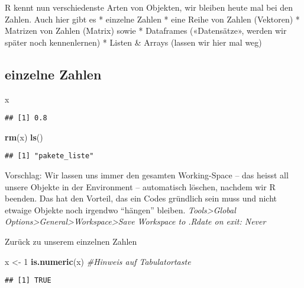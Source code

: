 \documentclass[
]{book}
\newenvironment{Shaded}{\begin{snugshade}}{\end{snugshade}}
\newcommand{\CommentTok}[1]{\textcolor[rgb]{0.56,0.35,0.01}{\textit{#1}}}
\newcommand{\DecValTok}[1]{\textcolor[rgb]{0.00,0.00,0.81}{#1}}
\newcommand{\KeywordTok}[1]{\textcolor[rgb]{0.13,0.29,0.53}{\textbf{#1}}}
\newcommand{\NormalTok}[1]{#1}
\newcommand{\StringTok}[1]{\textcolor[rgb]{0.31,0.60,0.02}{#1}}
\begin{document}
R kennt nun verschiedenste Arten von Objekten, wir bleiben heute mal bei den Zahlen.
Auch hier gibt es
* einzelne Zahlen
* eine Reihe von Zahlen (Vektoren)
* Matrizen von Zahlen (Matrix)
sowie
* Dataframes («Datensätze», werden wir später noch kennenlernen)
* Listen \& Arrays (lassen wir hier mal weg)

\hypertarget{einzelne-zahlen}{%
\subsection{einzelne Zahlen}\label{einzelne-zahlen}}

\begin{Shaded}
\begin{Highlighting}[]
\NormalTok{x}
\end{Highlighting}
\end{Shaded}

\begin{verbatim}
## [1] 0.8
\end{verbatim}

\begin{Shaded}
\begin{Highlighting}[]
\KeywordTok{rm}\NormalTok{(x)}
\KeywordTok{ls}\NormalTok{()}
\end{Highlighting}
\end{Shaded}

\begin{verbatim}
## [1] "pakete_liste"
\end{verbatim}

Vorschlag: Wir lassen uns immer den gesamten Working-Space -- das heisst all unsere Objekte in der Environment -- automatisch löschen, nachdem wir R beenden. Das hat den Vorteil, das ein Codes gründlich sein muss und nicht etwaige Objekte noch irgendwo ``hängen'' bleiben.
\emph{Tools\textgreater Global Options\textgreater General\textgreater Workspace\textgreater Save Workspace to .Rdate on exit: Never}

Zurück zu unserem einzelnen Zahlen

\begin{Shaded}
\begin{Highlighting}[]
\NormalTok{x <-}\StringTok{ }\DecValTok{1}
\KeywordTok{is.numeric}\NormalTok{(x) }\CommentTok{#Hinweis auf Tabulatortaste}
\end{Highlighting}
\end{Shaded}

\begin{verbatim}
## [1] TRUE
\end{verbatim}
\end{document}
